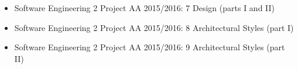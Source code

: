 \begin{itemize}
	\item Software Engineering 2 Project AA 2015/2016: 7 Design (parts I and II)
	\item Software Engineering 2 Project AA 2015/2016: 8 Architectural Styles (part I)
	\item Software Engineering 2 Project AA 2015/2016: 9 Architectural Styles (part II)
\end{itemize}